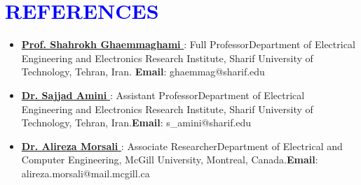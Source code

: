 \documentclass[letterpaper,11pt]{article}
\newcommand{\resumeSubHeadingListStart}{\begin{itemize}[leftmargin=0.0in, label={}]}
\begin{document}
\section{\Large{\textcolor{blue}{REFERENCES}}}
        \begin{itemize}[itemsep=-2pt, parsep=5pt]
            \item \href{http://sharif.edu/~ghaemmag/}{\textbf{Prof. Shahrokh Ghaemmaghami} {\raisebox{-0.1\height}\faExternalLink }}: Full Professor\newline Department of Electrical Engineering and Electronics Research Institute, Sharif University of Technology, Tehran, Iran. \newline \textbf{Email}: ghaemmag@sharif.edu 
            
            \item \href{https://scholar.google.com/citations?user=24GngZYAAAAJ&hl=en}{\textbf{Dr. Sajjad Amini} {\raisebox{-0.1\height}\faExternalLink }}: Assistant Professor\newline Department of Electrical Engineering and Electronics Research Institute, Sharif University of Technology, Tehran, Iran.\newline \textbf{Email}: s\_amini@sharif.edu
            
            
            \item \href{https://scholar.google.com/citations?user=y-RVrUkAAAAJ&hl=en}{\textbf{Dr. Alireza Morsali} {\raisebox{-0.1\height}\faExternalLink }}: Associate Researcher\newline Department of Electrical and Computer Engineering, McGill University, Montreal, Canada.\newline \textbf{Email}:  alireza.morsali@mail.mcgill.ca
        \end{itemize}
 
\end{document}
